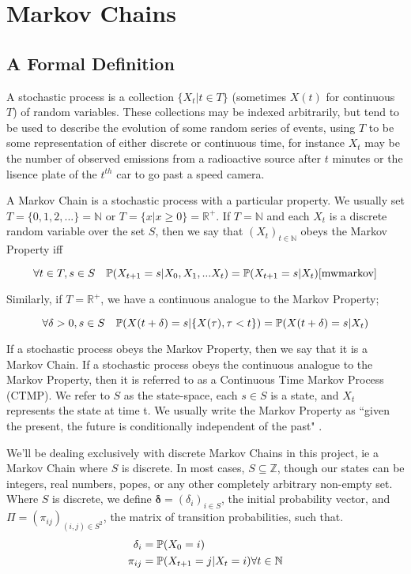 \section{Markov Chains}

\subsection{A Formal Definition}

A stochastic process \cite[p590]{doob96} is a collection $\{X_t  | t \in T\}$ (sometimes $X(t)$ for continuous $T$) of random variables. These collections may be indexed arbitrarily, but tend to be used to describe the evolution of some random series of events, using $T$ to be some representation of either discrete or continuous time, for instance $X_t$ may be the number of observed emissions from a radioactive source after $t$ minutes or the lisence plate of the $t^{th}$ car to go past a speed camera.

A Markov Chain is a stochastic process with a particular property. We usually set $T=\{0,1,2,...\}=\mathbb{N}$ or $T =\{x | x \geqslant 0 \} = \mathbb{R}^{+}$. If $T=\mathbb{N}$ and each $X_t$ is a discrete random variable over the set $S$, then we say that $(X_t)_{t \in \mathbb{N}}$ obeys the Markov Property iff

$$
\forall t \in T, s \in S \quad \mathbb{P} (X_{t+1} = s | X_0, X_1, ... X_t) = \mathbb{P} (X_{t+1} = s | X_t)\cite{mwmarkov}
$$

Similarly, if $T=\mathbb{R}^{+}$, we have a continuous analogue to the Markov Property;

$$
\forall \delta > 0, s \in S \quad \mathbb{P} (X(t+\delta) = s | \{X(\tau), \tau < t\}) = \mathbb{P} (X(t+\delta) = s | X_t)
$$

If a stochastic process obeys the Markov Property, then we say that it is a Markov Chain. If a stochastic process obeys the continuous analogue to the Markov Property, then it is referred to as a Continuous Time Markov Process (CTMP). We refer to $S$ as the state-space, each $s \in S$ is a state, and $X_t$ represents the state at time t. We usually write the Markov Property as ``given the present, the future is conditionally independent of the past" \cite{mwmarkov}.

We'll be dealing exclusively with discrete Markov Chains in this project, ie a Markov Chain where $S$ is discrete. In most cases, $S \subseteq \mathbb{Z}$, though our states can be integers, real numbers, popes, or any other completely arbitrary non-empty set. Where $S$ is discrete, we define $\mathbf{\delta} = (\delta_i)_{i \in S}$, the initial probability vector, and $\Pi = (\pi_{ij})_{(i,j) \in S^2}$, the matrix of transition probabilities, such that.
\begin{align*}
\delta_i &= \mathbb{P} (X_0 = i) \\
\pi_{ij} &= \mathbb{P}(X_{t+1} = j | X_t = i) \forall t \in \mathbb{N}
\end{align*}

